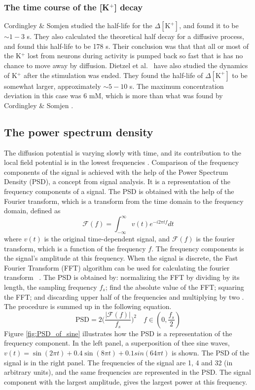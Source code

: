 \documentclass{article}
\begin{document}
\subsubsection{The time course of the [K$^+$] decay }\label{time course}

Cordingley \& Somjen \cite{CordingleySomjen} studied the half-life for the $\Delta[\text{K}^+]$, and found it to be $\sim 1-3$ s. They also calculated the theoretical half decay for a diffusive process, and found this half-life to be 178 s. Their conclusion was that that all or most
of the K$^+$ lost from neurons during activity is pumped back so fast that is has no
chance to move away by diffusion. Dietzel et al.\ \cite{Dietzel1982} have also studied the dynamics of K$^+$ after the stimulation was ended. They found the half-life of $\Delta [\text{K}^+]$ to be somewhat larger, approximately $\sim 5-10$ s. The maximum concentration deviation in this case was 6 mM, which is more than what was found by Cordingley \& Somjen \cite{CordingleySomjen}.

 
\subsection{The power spectrum density}\label{PSD}
The diffusion potential is varying slowly with time, and its contribution to the local field potential is in the lowest frequencies \cite{Halnes2016}. Comparison of the frequency components of the signal is achieved with the help of the Power Spectrum Density (PSD), a concept from signal analysis. It is a representation of the frequency components of a signal. The PSD is obtained with the help of the Fourier transform, which is a transform from the time domain to the frequency domain, defined as
\begin{equation}
\mathcal{F}(f)=\int_{-\infty}^{\infty} v(t)e^{-i2\pi tf} dt
\end{equation}
where $v(t)$ is the original time-dependent signal, and $\mathcal{F}(f)$ is the fourier transform, which is a function of the frequency $f$. The frequency components is the signal's amplitude at this frequency. When the signal is discrete, the Fast Fourier Transform (FFT) algorithm can be used for calculating the fourier transform ~\cite{wikipediaFFT}. The PSD is obtained by: normalizing the FFT by dividing by its length, the sampling frequency $f_s$; find the absolute value of the FFT; squaring the FFT; and discarding upper half of the frequencies and multiplying by two \cite{PSDtutorial}. The procedure is summed up in the following equation.
\begin{equation}
\text{PSD} = 2\bigg(\frac{|\mathcal{F}(f)|}{f_s}\bigg)^2 \quad f \in (0,\frac{f_s}{2})
\end{equation}
Figure \ref{fig:PSD_of_sine} illustrates how the PSD is a representation of the frequency component. In the left panel, a superposition of thee sine waves, $v(t) = \sin (2\pi t) + 0.4 \sin (8\pi t)+ 0.1 sin (64\pi t)$ is shown. The PSD of the signal is in the right panel. The frequencies of the signal are 1, 4 and 32 (in arbitrary units), and the same frequencies are represented in the PSD. The signal component with the largest amplitude, gives the largest power at this frequency.
\end{document}
